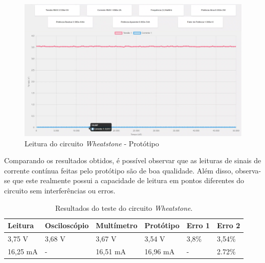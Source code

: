 \begin{figure}[htb!]
    \caption{Leitura do circuito \textit{Wheatstone} - Protótipo}
    \vspace*{5mm}
    \label{fig:wheatstone-boy}
    \includegraphics[width=1\textwidth]{figuras/wheatstone-boy.png}
    \fonte{}
\end{figure}

Comparando os resultados obtidos, é possível observar que as leituras de sinais de corrente contínua feitas pelo protótipo são de boa qualidade. Além disso, observa-se que este realmente possui a capacidade de leitura em pontos diferentes do circuito sem interferências ou erros.

\begin{table}[!ht]
    \centering
    \caption{Resultados do teste do circuito \textit{Wheatstone}.}
    \vspace*{5mm}
    \label{tab:resultados-wheatstone}
    \begin{tabular}{ l l l l l l }
        \hline
        \textbf{Leitura} & \textbf{Osciloscópio} & \textbf{Multímetro} & \textbf{Protótipo}    & \textbf{Erro 1}  & \textbf{Erro 2}   \\ \hline
        3,75 V           & 3,68 V                & 3,67 V              & 3,54 V                & 3,8\%            & 3,54\%            \\ 
        16,25 mA         & -                     & 16,51 mA            & 16,96 mA              & -                & 2.72\%            \\ \hline
    \end{tabular}
    \fonte{}
\end{table}